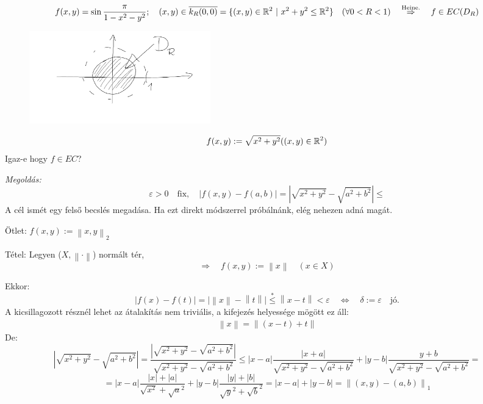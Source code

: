 \documentclass[a4paper,11.5pt]{article}
\newcommand{\norm}[1]{\left\lVert#1\right\rVert}
\begin{document}
	\begin{note}
		\[ f(x,y)=\sin\frac{\pi}{1-x^2-y^2};\quad (x,y)\in\overline{k_R(0,0)}=\{ (x,y)\in\mathbb{R}^2\ | \ x^2+y^2\leq \mathbb{R}^2 \}\quad (\forall 0<R<1)\quad \overset{\text{Heine.}}{\Rightarrow}\quad f\in EC(D_R) \]
		\begin{figure}[H]
			\centering
			\includegraphics[height=4cm]{kepek/55.png}
			\caption{}
		\end{figure}
	\end{note}
	\begin{task}
		\[ f(x,y):=\sqrt{x^2+y^2}((x,y)\in\mathbb{R}^2) \]
		Igaz-e hogy $f\in EC$?
		
		\textit{Megoldás:} 
		\[ \varepsilon>0\quad \text{fix},\quad |f(x,y)-f(a,b)|=|\sqrt{x^2+y^2}-\sqrt{a^2+b^2}|\leq \]
		A cél ismét egy felső becslés megadása. Ha ezt direkt módszerrel próbálnánk, elég nehezen adná magát.
		
		Ötlet: $f(x,y):=\norm{x,y}_2$
		
		Tétel: Legyen ($X,\norm{\cdot}$) normált tér,
		\[ \Rightarrow\quad f(x,y):=\norm{x}\quad (x\in X) \]
		
		Ekkor:
		\[ |f(x)-f(t)|=\big|\norm{x}-\norm{t}\big|\overset{*}{\leq}\norm{x-t}<\varepsilon\quad \Leftrightarrow\quad \delta:=\varepsilon\quad \text{jó.} \]
		A kicsillagozott résznél lehet az átalakítás nem triviális, a kifejezés helyessége mögött ez áll:
		\begin{align}
			\norm{x}=\norm{(x-t)+t}
		\end{align}
		De:
		\[ \left|\sqrt{x^2+y^2}-\sqrt{a^2+b^2}\right|=\frac{\left|\sqrt{x^2+y^2}-\sqrt{a^2+b^2}\right|}{\sqrt{x^2+y^2}-\sqrt{a^2+b^2}}\leq|x-a|\frac{|x+a|}{\sqrt{x^2+y^2}-\sqrt{a^2+b^2}}+|y-b|\frac{y+b}{\sqrt{x^2+y^2}-\sqrt{a^2+b^2}}= \]
		\[ = |x-a|\frac{|x|+|a|}{\sqrt{x^2}+\sqrt{a}^2}+|y-b|\frac{|y|+|b|}{\sqrt{y}^2+\sqrt{b}^2}=|x-a|+|y-b|=\norm{(x,y)-(a,b)}_1 \] 
	\end{task}
\end{document}
